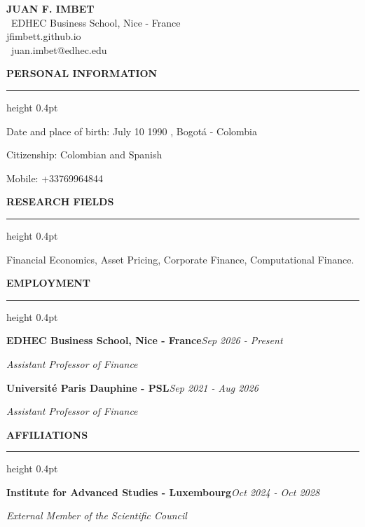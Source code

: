 \documentclass[11pt,letterpaper]{article}
\makeatletter
\newcommand{\cvsection}[1]{%
  \par\vspace{12.80pt}%
  \textbf{#1}\par\nobreak
  \vspace{6.08pt}\hrule height 0.4pt\nobreak\vspace{6.9pt}\nobreak}
\newenvironment{cvbody}
  {\begin{list}{}{%
      \@beginparpenalty\@M      %
      \setlength{\leftmargin}{1.5em}%
      \setlength{\rightmargin}{0pt}%
      \setlength{\labelwidth}{0pt}%
      \setlength{\labelsep}{0pt}%
      \setlength{\listparindent}{0pt}%
      \setlength{\itemindent}{0pt}%
      \setlength{\topsep}{0pt}%
      \setlength{\partopsep}{0pt}%
      \setlength{\parsep}{0pt}%
      \setlength{\itemsep}{0pt}}%
   \item\relax}
  {\end{list}}
\newcommand{\dated}[2]{#1\hfill\textit{#2}\par}
\makeatother
\begin{document}
\begingroup\centering
  {\huge\bfseries JUAN F. IMBET}\\[12.0pt]
  \faMapMarker\ EDHEC Business School, Nice - France\\[2.95pt]
  \faLink{}jfimbett.github.io\\[2.95pt]
  \faEnvelope\ juan.imbet@edhec.edu
\par\endgroup
\vspace{3.0pt}

\cvsection{PERSONAL INFORMATION}
\begin{cvbody}
Date and place of birth: July 10 1990 , Bogotá - Colombia\par
Citizenship: Colombian and Spanish\par
Mobile: +33769964844\par
\end{cvbody}

\cvsection{RESEARCH FIELDS}
\begin{cvbody}
Financial Economics, Asset Pricing, Corporate Finance, Computational Finance.\par
\end{cvbody}

\cvsection{EMPLOYMENT}
\begin{cvbody}
\dated{\textbf{EDHEC Business School, Nice - France}}{Sep 2026 - Present}
\textit{Assistant Professor of Finance}\par
\dated{\textbf{Université Paris Dauphine - PSL}}{Sep 2021 - Aug 2026}
\textit{Assistant Professor of Finance}\par
\end{cvbody}

\cvsection{AFFILIATIONS}
\begin{cvbody}
\dated{\textbf{Institute for Advanced Studies - Luxembourg}}{Oct 2024 - Oct 2028}
\textit{External Member of the Scientific Council}\par
\end{cvbody}
\end{document}
